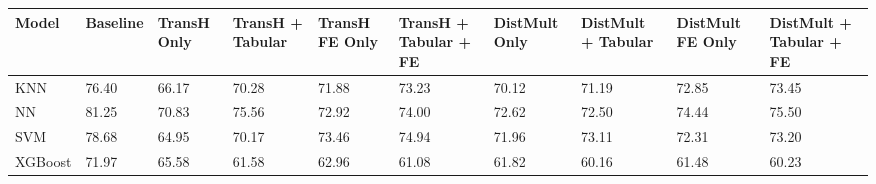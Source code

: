 \begin{tabular}{llllllllll}
\toprule
Model & Baseline & TransH Only & TransH + Tabular & TransH FE Only & TransH + Tabular + FE & DistMult Only & DistMult + Tabular & DistMult FE Only & DistMult + Tabular + FE \\
\midrule
KNN & 76.40 & 66.17 & 70.28 & 71.88 & 73.23 & 70.12 & 71.19 & 72.85 & 73.45 \\
NN & 81.25 & 70.83 & 75.56 & 72.92 & 74.00 & 72.62 & 72.50 & 74.44 & 75.50 \\
SVM & 78.68 & 64.95 & 70.17 & 73.46 & 74.94 & 71.96 & 73.11 & 72.31 & 73.20 \\
XGBoost & 71.97 & 65.58 & 61.58 & 62.96 & 61.08 & 61.82 & 60.16 & 61.48 & 60.23 \\
\bottomrule
\end{tabular}
